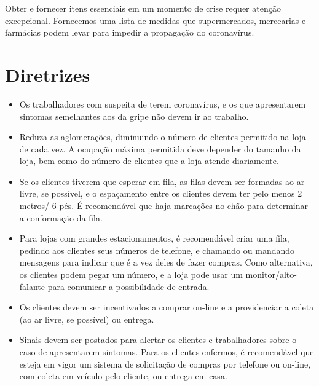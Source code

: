\documentclass[onecolumn,journal]{IEEEtran}
\begin{document}


\begin{multicols}{2}


Obter e fornecer itens essenciais em um momento de crise requer atenção excepcional. Fornecemos uma lista de medidas que supermercados, mercearias e farmácias podem levar para impedir a propagação do coronavírus.

\section*{Diretrizes}
\begin{itemize}
\item Os trabalhadores com suspeita de terem coronavírus, e os que apresentarem sintomas semelhantes aos da gripe não devem ir ao trabalho.
\item Reduza as aglomerações, diminuindo o número de clientes permitido na loja de cada vez. A ocupação máxima permitida deve depender do tamanho da loja, bem como do número de clientes que a loja atende diariamente.
\item Se os clientes tiverem que esperar em fila, as filas devem ser formadas ao ar livre, se possível, e o espaçamento entre os clientes devem ter pelo menos 2 metros/ 6 pés. É recomendável que haja marcações no chão para determinar a conformação da fila.
\item Para lojas com grandes estacionamentos, é recomendável criar uma fila, pedindo aos clientes seus números de telefone, e chamando ou mandando mensagens para indicar que é a vez deles de fazer compras. Como alternativa, os clientes podem pegar um número, e a loja pode usar um monitor/alto-falante para comunicar a possibilidade de entrada.
\item Os clientes devem ser incentivados a comprar on-line e a providenciar a coleta (ao ar livre, se possível) ou entrega.
\item Sinais devem ser postados para alertar os clientes e trabalhadores sobre o caso de apresentarem sintomas. Para os clientes enfermos, é recomendável que esteja em vigor um sistema de solicitação de compras por telefone ou on-line, com coleta em veículo pelo cliente, ou entrega em casa.

\end{itemize}
\end{multicols}
\end{document}
